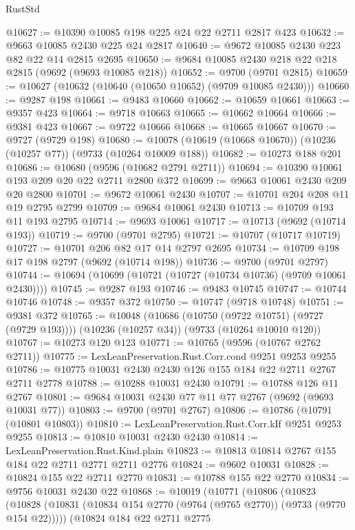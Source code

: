 \begin{lexlean}{RustStd}
\begin{coremodule}
{\begin{coremodule}
{{{{{{{{{{{{{{{{{{{{{{{{{{{{{{{{{{{{{{{{{{{{{{{{{{{{{{{@10627 := @10390 @10085 @198 @225 @24 @22 @2711 @2817 @423
@10632 := @9663 @10085 @2430 @225 @24 @2817
@10640 := @9672 @10085 @2430 @223 @82 @22 @14 @2815 @2695
@10650 := @9684 @10085 @2430 @218 @22 @218 @2815 (@9692 (@9693 @10085 @218))
@10652 := @9700 (@9701 @2815)
@10659 := @10627 (@10632 (@10640 (@10650 @10652) (@9709 @10085 @2430)))
@10660 := @9287 @198
@10661 := @9483 @10660
@10662 := @10659 @10661
@10663 := @9357 @423
@10664 := @9718 @10663
@10665 := @10662 @10664
@10666 := @9381 @423
@10667 := @9722 @10666
@10668 := @10665 @10667
@10670 := @9727 (@9729 @198)
@10680 := @10078 (@10619 (@10668 @10670)) (@10236 (@10257 @77)) (@9733 (@10264 @10009 @188))
@10682 := @10273 @188 @201
@10686 := @10680 (@9596 (@10682 @2791 @2711))
@10694 := @10390 @10061 @193 @209 @20 @22 @2711 @2800 @372
@10699 := @9663 @10061 @2430 @209 @20 @2800
@10701 := @9672 @10061 @2430
@10707 := @10701 @204 @208 @11 @19 @2795 @2799
@10709 := @9684 @10061 @2430
@10713 := @10709 @193 @11 @193 @2795
@10714 := @9693 @10061
@10717 := @10713 (@9692 (@10714 @193))
@10719 := @9700 (@9701 @2795)
@10721 := @10707 (@10717 @10719)
@10727 := @10701 @206 @82 @17 @14 @2797 @2695
@10734 := @10709 @198 @17 @198 @2797 (@9692 (@10714 @198))
@10736 := @9700 (@9701 @2797)
@10744 := @10694 (@10699 (@10721 (@10727 (@10734 @10736) (@9709 @10061 @2430))))
@10745 := @9287 @193
@10746 := @9483 @10745
@10747 := @10744 @10746
@10748 := @9357 @372
@10750 := @10747 (@9718 @10748)
@10751 := @9381 @372
@10765 := @10048
    (@10686 (@10750 (@9722 @10751) (@9727 (@9729 @193))))
    (@10236 (@10257 @34))
    (@9733 (@10264 @10010 @120))
@10767 := @10273 @120 @123
@10771 := @10765 (@9596 (@10767 @2762 @2711))
@10775 := LexLeanPreservation.Rust.Corr.cond @9251 @9253 @9255
@10786 := @10775 @10031 @2430 @2430 @126 @155 @184 @22 @2711 @2767 @2711 @2778
@10788 := @10288 @10031 @2430
@10791 := @10788 @126 @11 @2767
@10801 := @9684 @10031 @2430 @77 @11 @77 @2767 (@9692 (@9693 @10031 @77))
@10803 := @9700 (@9701 @2767)
@10806 := @10786 (@10791 (@10801 @10803))
@10810 := LexLeanPreservation.Rust.Corr.kIf @9251 @9253 @9255
@10813 := @10810 @10031 @2430 @2430
@10814 := LexLeanPreservation.Rust.Kind.plain
@10823 := @10813 @10814 @2767 @155 @184 @22 @2711 @2771 @2711 @2776
@10824 := @9602 @10031
@10828 := @10824 @155 @22 @2711 @2770
@10831 := @10788 @155 @22 @2770
@10834 := @9756 @10031 @2430 @22
@10868 := @10019
    (@10771
      (@10806
        (@10823
          (@10828 (@10831 (@10834 @154 @2770 (@9764 (@9765 @2770)) (@9733 (@9770 @154 @22)))))
          (@10824
            @184
            @22
            @2711
            @2775
}}}}}}}}}}}}}}}}}}}}}}}}}}}}}}}}}}}}}}}}}}}}}}}}}}}}}}}
\end{coremodule}}
\end{coremodule}
\end{lexlean}
